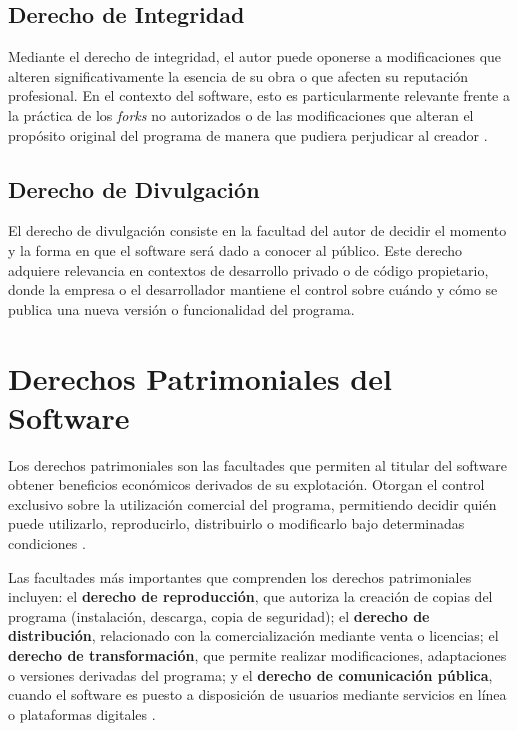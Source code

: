 \documentclass[11pt,a4paper]{report}
\begin{document}
\subsection{Derecho de Integridad}

Mediante el derecho de integridad, el autor puede oponerse a modificaciones que alteren significativamente la esencia de su obra o que afecten su reputación profesional. En el contexto del software, esto es particularmente relevante frente a la práctica de los \textit{forks} no autorizados o de las modificaciones que alteran el propósito original del programa de manera que pudiera perjudicar al creador \citep{ompi2024}.

\subsection{Derecho de Divulgación}

El derecho de divulgación consiste en la facultad del autor de decidir el momento y la forma en que el software será dado a conocer al público. Este derecho adquiere relevancia en contextos de desarrollo privado o de código propietario, donde la empresa o el desarrollador mantiene el control sobre cuándo y cómo se publica una nueva versión o funcionalidad del programa.

\section{Derechos Patrimoniales del Software}

Los derechos patrimoniales son las facultades que permiten al titular del software obtener beneficios económicos derivados de su explotación. Otorgan el control exclusivo sobre la utilización comercial del programa, permitiendo decidir quién puede utilizarlo, reproducirlo, distribuirlo o modificarlo bajo determinadas condiciones \citep{ompi2024}.

Las facultades más importantes que comprenden los derechos patrimoniales incluyen: el \textbf{derecho de reproducción}, que autoriza la creación de copias del programa (instalación, descarga, copia de seguridad); el \textbf{derecho de distribución}, relacionado con la comercialización mediante venta o licencias; el \textbf{derecho de transformación}, que permite realizar modificaciones, adaptaciones o versiones derivadas del programa; y el \textbf{derecho de comunicación pública}, cuando el software es puesto a disposición de usuarios mediante servicios en línea o plataformas digitales \citep{ompi2024}.
\end{document}
